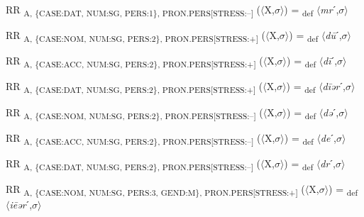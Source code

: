 {\begin{exe}
 RR \textsubscript{A, \{CASE:DAT, NUM:SG, PERS:1\}, PRON.PERS[STRESS:–]} ($\langle$X,$\sigma $$\rangle$) = \textsubscript{def} $\langle$\textit{mr}ˊ,$\sigma $$\rangle$
\end{exe}

\begin{exe}
 RR \textsubscript{A, \{CASE:NOM, NUM:SG, PERS:2\}, PRON.PERS[STRESS:+]} ($\langle$X,$\sigma $$\rangle$) = \textsubscript{def} $\langle$\textit{d\=u}ˊ,$\sigma $$\rangle$
\end{exe}

\begin{exe}
 RR \textsubscript{A, \{CASE:ACC, NUM:SG, PERS:2\}, PRON.PERS[STRESS:+]} ($\langle$X,$\sigma $$\rangle$) = \textsubscript{def} $\langle$\textit{d\=i}ˊ,$\sigma $$\rangle$
\end{exe}

\begin{exe}
 RR \textsubscript{A, \{CASE:DAT, NUM:SG, PERS:2\}, PRON.PERS[STRESS:+]} ($\langle$X,$\sigma $$\rangle$) = \textsubscript{def} $\langle$\textit{d\=iər}ˊ,$\sigma $$\rangle$
\end{exe}

\begin{exe}
 RR \textsubscript{A, \{CASE:NOM, NUM:SG, PERS:2\}, PRON.PERS[STRESS:–]} ($\langle$X,$\sigma $$\rangle$) = \textsubscript{def} $\langle$\textit{də}ˊ,$\sigma $$\rangle$
\end{exe}

\begin{exe}
 RR \textsubscript{A, \{CASE:ACC, NUM:SG, PERS:2\}, PRON.PERS[STRESS:–]} ($\langle$X,$\sigma $$\rangle$) = \textsubscript{def} $\langle$\textit{de}ˊ,$\sigma $$\rangle$
\end{exe}

\begin{exe}
 RR \textsubscript{A, \{CASE:DAT, NUM:SG, PERS:2\}, PRON.PERS[STRESS:–]} ($\langle$X,$\sigma $$\rangle$) = \textsubscript{def} $\langle$\textit{dr}ˊ,$\sigma $$\rangle$
\end{exe}

\begin{exe}
 RR \textsubscript{A, \{CASE:NOM, NUM:SG, PERS:3, GEND:M\}, PRON.PERS[STRESS:+]} ($\langle$X,$\sigma $$\rangle$) = \textsubscript{def} $\langle$\textit{i\=eər}ˊ,$\sigma $$\rangle$
\end{exe}

}
